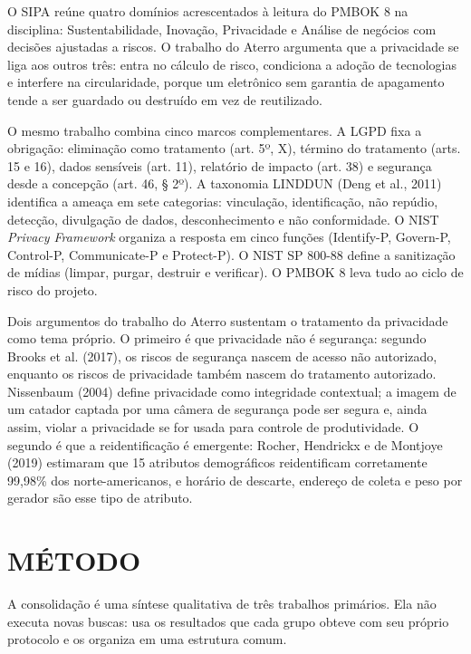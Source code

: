 \documentclass[12pt,a4paper,article,oneside,english,brazil]{abntex2}
\begin{document}
O SIPA reúne quatro domínios acrescentados à leitura do PMBOK 8 na disciplina: Sustentabilidade, Inovação, Privacidade e Análise de negócios com decisões ajustadas a riscos. O trabalho do Aterro argumenta que a privacidade se liga aos outros três: entra no cálculo de risco, condiciona a adoção de tecnologias e interfere na circularidade, porque um eletrônico sem garantia de apagamento tende a ser guardado ou destruído em vez de reutilizado.

O mesmo trabalho combina cinco marcos complementares. A LGPD fixa a obrigação: eliminação como tratamento (art. 5º, X), término do tratamento (arts. 15 e 16), dados sensíveis (art. 11), relatório de impacto (art. 38) e segurança desde a concepção (art. 46, § 2º). A taxonomia LINDDUN (Deng et al., 2011) identifica a ameaça em sete categorias: vinculação, identificação, não repúdio, detecção, divulgação de dados, desconhecimento e não conformidade. O NIST \textit{Privacy Framework} organiza a resposta em cinco funções (Identify-P, Govern-P, Control-P, Communicate-P e Protect-P). O NIST SP 800-88 define a sanitização de mídias (limpar, purgar, destruir e verificar). O PMBOK 8 leva tudo ao ciclo de risco do projeto.

Dois argumentos do trabalho do Aterro sustentam o tratamento da privacidade como tema próprio. O primeiro é que privacidade não é segurança: segundo Brooks et al. (2017), os riscos de segurança nascem de acesso não autorizado, enquanto os riscos de privacidade também nascem do tratamento autorizado. Nissenbaum (2004) define privacidade como integridade contextual; a imagem de um catador captada por uma câmera de segurança pode ser segura e, ainda assim, violar a privacidade se for usada para controle de produtividade. O segundo é que a reidentificação é emergente: Rocher, Hendrickx e de Montjoye (2019) estimaram que 15 atributos demográficos reidentificam corretamente 99,98\% dos norte-americanos, e horário de descarte, endereço de coleta e peso por gerador são esse tipo de atributo.

\section{MÉTODO}

A consolidação é uma síntese qualitativa de três trabalhos primários. Ela não executa novas buscas: usa os resultados que cada grupo obteve com seu próprio protocolo e os organiza em uma estrutura comum.
\end{document}
